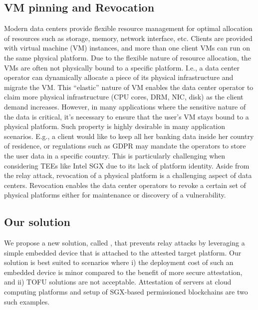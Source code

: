 \subsection{VM pinning and Revocation} 

Modern data centers provide flexible resource management for optimal allocation of resources such as storage, memory, network interface, etc. Clients are provided with virtual machine (VM) instances, and more than one client VMs can run on the same physical platform. Due to the flexible nature of resource allocation, the VMs are often not physically bound to a specific platform. I.e., a data center operator can dynamically allocate a piece of its physical infrastructure and migrate the VM. This ``elastic'' nature of VM enables the data center operator to claim more physical infrastructure (CPU cores, DRM, NIC, disk) as the client demand increases. However, in many applications where the sensitive nature of the data is critical, it's necessary to ensure that the user's VM stays bound to a physical platform. Such property is highly desirable in many application scenarios. E.g., a client would like to keep all her banking data inside her country of residence, or regulations such as GDPR may mandate the operators to store the user data in a specific country. This is particularly challenging when considering TEEs like Intel SGX due to its lack of platform identity. Aside from the relay attack, revocation of a physical platform is a challenging aspect of data centers. Revocation enables the data center operators to revoke a certain set of physical platforms either for maintenance or discovery of a vulnerability.

\subsection{Our solution} 

We propose a new solution, called \name, that prevents relay attacks by leveraging a simple embedded device that is attached to the attested target platform. Our solution is best suited to scenarios where i) the deployment cost of such an embedded device is minor compared to the benefit of more secure attestation, and ii) TOFU solutions are not acceptable. Attestation of servers at cloud computing platforms and setup of SGX-based permissioned blockchains are two such examples. 

